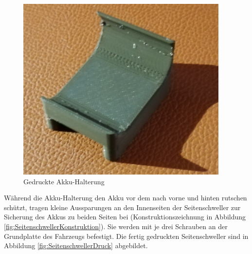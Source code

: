 \begin{minipage}[b]{0.45\textwidth}
\begin{figure}[H] %
\includegraphics[width=.85\textwidth]{sec2/images/3DAnbaukomponenten/Druckbilder/AkkuHalterungDruck} 
\centering
\captionsetup{width=.9\textwidth}
\caption[Gedruckte Akku-Halterung]{Gedruckte Akku-Halterung}\centering
\label{fig:AkkuHalterungDruck}
\end{figure}
\end{minipage}
\vspace{4mm}

Während die Akku-Halterung den Akku vor dem nach vorne und hinten rutschen schützt, tragen kleine Aussparungen an den Innenseiten der Seitenschweller zur Sicherung des Akkus zu beiden Seiten bei (Konstruktionszeichnung in Abbildung \ref{fig:SeitenschwellerKonstruktion}). Sie werden mit je drei Schrauben an der Grundplatte des Fahrzeugs befestigt. Die fertig gedruckten Seitenschweller sind in Abbildung \ref{fig:SeitenschwellerDruck} abgebildet.

